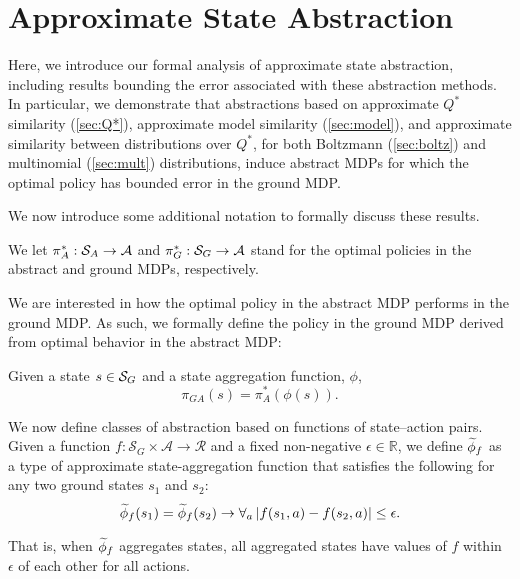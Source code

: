 \section{Approximate State Abstraction}

\label{sec:theory_results}
Here, we introduce our formal analysis of approximate state abstraction, including results bounding the error associated with these abstraction methods. In particular, we demonstrate that abstractions based on approximate $Q^*$ similarity (\ref{sec:Q*}), approximate model similarity (\ref{sec:model}), and approximate similarity between distributions over $Q^*$, for both Boltzmann (\ref{sec:boltz}) and multinomial (\ref{sec:mult}) distributions, induce abstract \acp{MDP} for which the optimal policy has bounded error in the ground MDP.

We now introduce some additional notation to formally discuss these results.

We let $\pi_A^* : \mathcal{S}_A \rightarrow \mathcal{A}$ and $\pi_G^* : \mathcal{S}_G \rightarrow \mathcal{A}$ stand for the optimal policies in the abstract and ground \acp{MDP}, respectively.
\edefn

We are interested in how the optimal policy in the abstract \ac{MDP} performs in the ground \ac{MDP}. As such, we formally define the policy in the ground \ac{MDP} derived from optimal behavior in the abstract \ac{MDP}:

Given a state $s \in \mathcal{S}_G$ and a state aggregation function, $\phi$, 
\begin{equation}
\pi_{GA}(s)=\pi_A^*(\phi(s)).
\end{equation}
\edefn

We now define classes of abstraction based on functions of state--action pairs.
Given a function $f: \mathcal{S}_G \times \mathcal{A} \rightarrow \mathcal{R}$ and a fixed non-negative $\epsilon \in \mathbb{R}$, we define $\widetilde \phi_f$ as a type of approximate state-aggregation function that satisfies the following for any two ground states $s_1$ and $s_2$: 
\begin{equation}
\label{eq:phi_f}
\widetilde \phi_f(s_1) = \widetilde \phi_f(s_2) \rightarrow \forall_a \left|f(s_1, a) - f(s_2, a)\right| \leq \epsilon.
\end{equation}
\edefn

That is, when $\widetilde \phi_f$ aggregates states, all aggregated states have values of $f$ within $\epsilon$ of each other for all actions.

